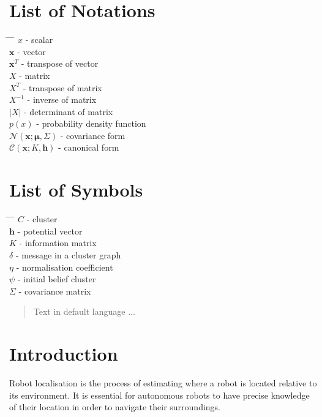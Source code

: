 \documentclass[12pt,oneside,openany,a4paper, %
afrikaans,english,
]{memoir}
\numberwithin{equation}{chapter}
\begin{document}
\chapter{List of Notations}
\begin{tabbing}
\hspace*{1em}\= \hspace*{5em} \= \hspace*{3em} \= \kill %
\> $x$	\> - \> scalar\\
\> $\bm{x}$	\> - \> vector\\
\> $\bm{x}^T$	\> - \> transpose of vector\\
\> $X$ \> - \> matrix\\
\> $X^T$ \> - \> transpose of matrix\\
\> $X^{-1}$ \> - \> inverse of matrix\\
\> $|X|$ \> - \> determinant of matrix\\
\> $p(x)$ \> - \> probability density function\\
\> $\mathcal{N}(\bm{x}; \bm{\mu}, \Sigma)$ \> - \> covariance form\\
\> $\mathcal{C}(\bm{x}; K, \bm{h})$ \> - \> canonical form
\end{tabbing}

\chapter{List of Symbols}
\begin{tabbing}
\hspace*{1em}\= \hspace*{5em} \= \hspace*{3em} \= \kill %
\> $C$	\> - \> cluster\\
\> $\bm{h}$	\> - \> potential vector\\
\> $K$	\> - \> information matrix\\
\> $\delta$ \> - \> message in a cluster graph\\
\> $\eta$ \> - \> normalisation coefficient\\
\> $\psi$ \> - \> initial belief cluster\\
\> $\Sigma$ \> - \> covariance matrix
\end{tabbing}
\begin{abstract}
Text in default language ...
\end{abstract}


\mainmatter
\chapter{Introduction}
Robot localisation is the process of estimating where a robot is located relative to its environment. It is essential for autonomous robots to have precise knowledge of their location in order to navigate their surroundings.
\end{document}
